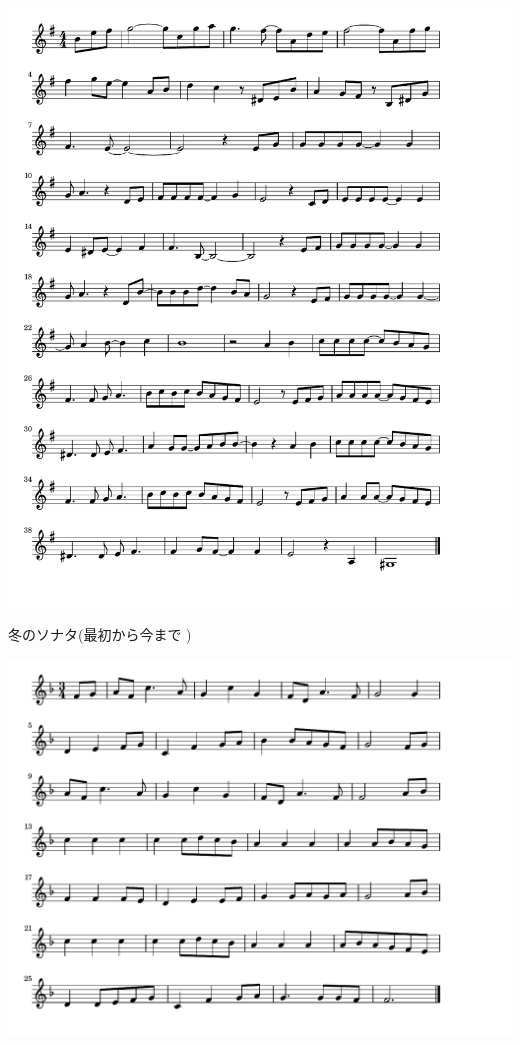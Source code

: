 \documentclass[a4paper]{ltjsarticle}
\begin{document}
\includegraphics[clip]{fuyunosonata_crop.pdf}

\vspace{-10mm} \hspace{10mm}
冬のソナタ(最初から今まで )

\includegraphics[clip]{itsumonando_crop.pdf}
\end{document}

